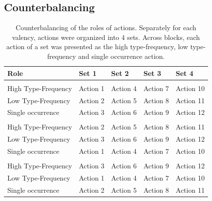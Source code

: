 \documentclass[
]{article}
\begin{document}
\subsection{Counterbalancing}\label{counterbalancing}

\begin{longtable}[t]{lllll}
\caption{\label{tab:counterbalancing-frequency-conditions-print2}Counterbalancing of the roles of actions. Separately for each valency, actions were organized into 4 sets. Across blocks, each action of a set was presented as the high type-frequency, low type-frequency and single occurrence action.}\\
\toprule
Role & Set 1 & Set 2 & Set 3 & Set 4\\
\midrule
\addlinespace[0.3em]
\multicolumn{5}{l}{\textbf{Condition 1}}\\
\hspace{1em}High Type-Frequency & Action 1 & Action 4 & Action 7 & Action 10\\
\hspace{1em}Low Type-Frequency & Action 2 & Action 5 & Action 8 & Action 11\\
\hspace{1em}Single occurrence & Action 3 & Action 6 & Action 9 & Action 12\\
\addlinespace[0.3em]
\multicolumn{5}{l}{\textbf{Condition 2}}\\
\hspace{1em}High Type-Frequency & Action 2 & Action 5 & Action 8 & Action 11\\
\hspace{1em}Low Type-Frequency & Action 3 & Action 6 & Action 9 & Action 12\\
\hspace{1em}Single occurrence & Action 1 & Action 4 & Action 7 & Action 10\\
\addlinespace[0.3em]
\multicolumn{5}{l}{\textbf{Condition 3}}\\
\hspace{1em}High Type-Frequency & Action 3 & Action 6 & Action 9 & Action 12\\
\hspace{1em}Low Type-Frequency & Action 1 & Action 4 & Action 7 & Action 10\\
\hspace{1em}Single occurrence & Action 2 & Action 5 & Action 8 & Action 11\\
\bottomrule
\end{longtable}
\end{document}
